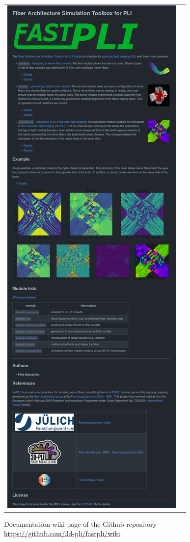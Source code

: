 \begin{figure}[!t]
{{\begin{tabular}{c|c}
 	\includegraphics[valign=T,trim=0 0 0 1580, clip]{gfx/fastpli/fastpli_wiki.png} \\
    \end{tabular}
    }}
	\caption{Documentation wiki page of the Github repository \url{https://github.com/3d-pli/fastpli/wiki}.}
	\label{fig:fastpli_wiki}
\end{figure}
